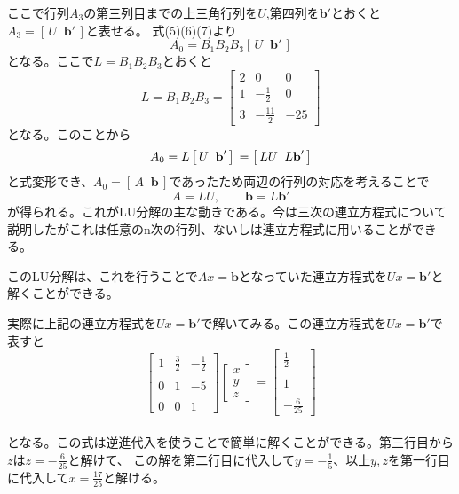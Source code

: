 \documentclass[a4paper,11pt]{jsarticle}
\begin{document}
ここで行列$A_3$の第三列目までの上三角行列を$U$,第四列を$\textbf{b}'$とおくと$A_3=\left[\,U \;\; \textbf{b}'\,\right]$と表せる。
式(5)(6)(7)より
\begin{equation}
    A_0 = B_1 B_2 B_3\left[\,U \;\; \textbf{b}'\,\right]
\end{equation} 
となる。ここで$L=B_1B_2B_3$とおくと
\begin{equation}
    L = B_1 B_2 B_3 
    = 
    \begin{bmatrix}
        2 & 0 & 0 \\
        1 & \displaystyle -\frac{1}{2} & 0 \\
        3 & \displaystyle -\frac{11}{2} & -25
    \end{bmatrix}
\end{equation} 
となる。このことから
\begin{equation}
    A_0 = L\left[\,U \;\; \textbf{b}'\,\right] \\
    = \left[\,LU \;\; L\textbf{b}'\,\right]
\end{equation} 
と式変形でき、$A_0 = \left[\,A \;\; \textbf{b}\,\right]$であったため両辺の行列の対応を考えることで
\begin{equation}
    A = LU, \qquad \textbf{b} = L\textbf{b}'
\end{equation} 
が得られる。これがLU分解の主な動きである。今は三次の連立方程式について説明したがこれは任意のn次の行列、ないしは連立方程式に用いることができる。

このLU分解は、これを行うことで$Ax=\textbf{b}$となっていた連立方程式を$Ux=\textbf{b}'$と解くことができる。

実際に上記の連立方程式を$Ux=\textbf{b}'$で解いてみる。この連立方程式を$Ux=\textbf{b}'$で表すと
\begin{equation}
    \begin{bmatrix}
        1 & \displaystyle \frac{3}{2} & \displaystyle -\frac{1}{2}  \\ \\
        0 & 1 & -5 \\ \\ 
        0 & 0 & 1 
    \end{bmatrix}
    \begin{bmatrix}
        x \\ y \\ z
    \end{bmatrix}
    =
    \begin{bmatrix}
        \displaystyle \frac{1}{2} \\ \\ 1 \\ \\ \displaystyle -\frac{6}{25}
    \end{bmatrix}
\end{equation}
\\
となる。この式は逆進代入を使うことで簡単に解くことができる。第三行目から$z$は$z=-\tfrac{6}{25}$と解けて、
この解を第二行目に代入して$y=-\tfrac{1}{5}$、以上$y,z$を第一行目に代入して$x=\tfrac{17}{25}$と解ける。
\end{document}
